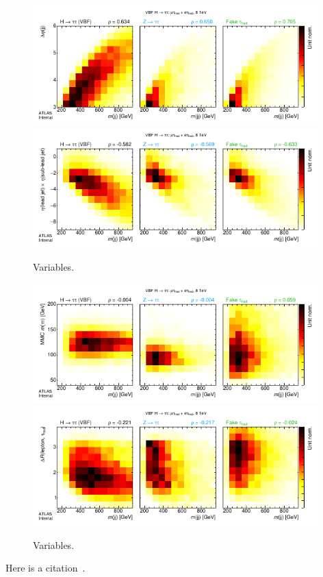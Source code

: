 \clearpage
\begin{figure}[tp]
  \centering
  \includegraphics[width=0.98\textwidth]{figures/kinematiccorrelations/jj_mass-vs-jj_deta}
  \includegraphics[width=0.98\textwidth]{figures/kinematiccorrelations/jj_mass-vs-jj_etaprod}
  \caption{Variables.}
  \label{fig:strategy-kinematic-correlations-3}
\end{figure}

\begin{figure}[tp]
  \centering
  \includegraphics[width=0.98\textwidth]{figures/kinematiccorrelations/jj_mass-vs-mMMC}
  \includegraphics[width=0.98\textwidth]{figures/kinematiccorrelations/jj_mass-vs-taulep_dR}
  \caption{Variables.}
  \label{fig:strategy-kinematic-correlations-4}
\end{figure}

Here is a citation~\cite{1999.ATLAS.Physics-TDR}.


